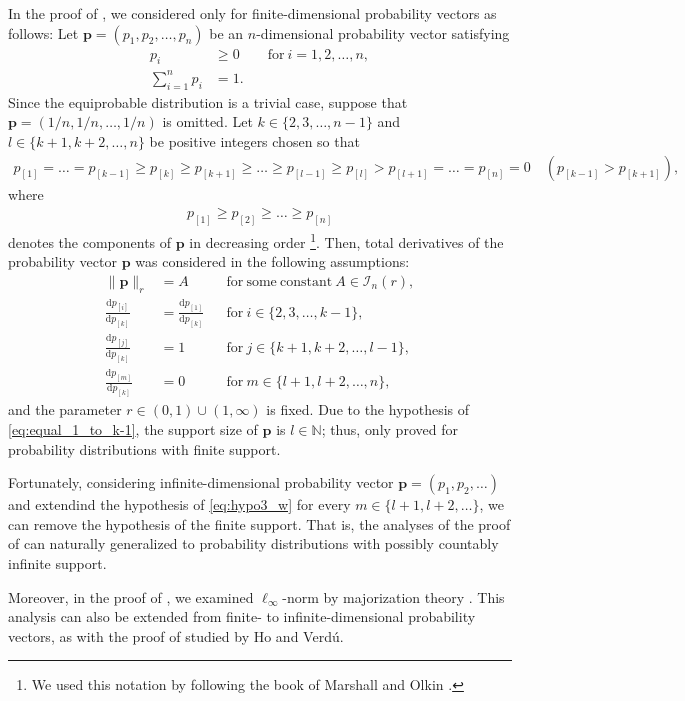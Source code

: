 \documentclass[conference, draftcls, onecolumn]{IEEEtran}
\theoremstyle{plain}
\newcommand{\bvec}[1]{\boldsymbol{#1}}
\newcommand{\thref}[1]{Theorem~\ref{#1}}
\begin{document}
\begin{IEEEproof}[Proof of \thref{th:w}]
In the proof of \cite[Lemma~2]{itw2016_reject}, we considered only for finite-dimensional probability vectors as follows:
Let $\bvec{p} = (p_{1}, p_{2}, \dots, p_{n})$ be an $n$-dimensional probability vector satisfying
\begin{align}
p_{i}
& \ge
0
\qquad \mathrm{for} \ i = 1, 2, \dots, n,
\\
\sum_{i = 1}^{n} p_{i}
& =
1 .
\end{align}
Since the equiprobable distribution is a trivial case, suppose that $\bvec{p} = (1/n, 1/n, \dots, 1/n)$ is omitted.
Let $k \in \{ 2, 3, \dots, n-1 \}$ and $l \in \{ k+1, k+2, \dots, n \}$ be positive integers chosen so that
\begin{align}
p_{[1]} = \dots = p_{[k-1]} \ge p_{[k]} \ge p_{[k+1]} \ge \dots \ge p_{[l-1]} \ge p_{[l]} > p_{[l+1]} = \dots = p_{[n]} = 0
\quad (p_{[k-1]} > p_{[k+1]}) ,
\label{eq:equal_1_to_k-1}
\end{align}
where
\begin{align}
p_{[1]} \ge p_{[2]} \ge \dots \ge p_{[n]}
\end{align}
denotes the components of $\bvec{p}$ in decreasing order%
\footnote{We used this notation by following the book of Marshall and Olkin \cite{marshall}.}.
Then, total derivatives of the probability vector $\bvec{p}$ was considered in the following assumptions:
\begin{align}
\| \bvec{p} \|_{r}
& =
A
&& \mathrm{for \ some \ constant} \ A \in \mathcal{I}_{n}( r ) ,
\\
\frac{ \mathrm{d} p_{[i]} }{ \mathrm{d} p_{[k]} }
& =
\frac{ \mathrm{d} p_{[1]} }{ \mathrm{d} p_{[k]} }
&& \mathrm{for} \ i \in \{ 2, 3, \dots, k-1 \} ,
\label{eq:hypo1_w} \\
\frac{ \mathrm{d} p_{[j]} }{ \mathrm{d} p_{[k]} }
& =
1
&& \mathrm{for} \ j \in \{ k+1, k+2, \dots, l-1 \} ,
\label{eq:hypo2_w} \\
\frac{ \mathrm{d} p_{[m]} }{ \mathrm{d} p_{[k]} }
& =
0
&& \mathrm{for} \ m \in \{ l+1, l+2, \dots, n \} ,
\label{eq:hypo3_w}
\end{align}
and the parameter $r \in (0, 1) \cup (1, \infty)$ is fixed.
Due to the hypothesis of \eqref{eq:equal_1_to_k-1}, the support size of $\bvec{p}$ is $l \in \mathbb{N}$;
thus, \cite[Lemma~2]{itw2016_reject} only proved for probability distributions with finite support.
 

Fortunately, considering infinite-dimensional probability vector $\bvec{p} = (p_{1}, p_{2}, \dots)$ and extendind the hypothesis of \eqref{eq:hypo3_w} for every $m \in \{ l+1, l+2, \dots \}$, we can remove the hypothesis of the finite support.
That is, the analyses of the proof of \cite[Lemma~2]{itw2016_reject} can naturally generalized to probability distributions with possibly countably infinite support.

Moreover, in the proof of \cite[Lemma~2]{itw2016_reject}, we examined $\ell_{\infty}$-norm by majorization theory \cite{marshall}.
This analysis can also be extended from finite- to infinite-dimensional probability vectors, as with the proof of \cite[Theorem~10]{verdu} studied by Ho and Verd\'{u}.
\end{IEEEproof}
\end{document}
